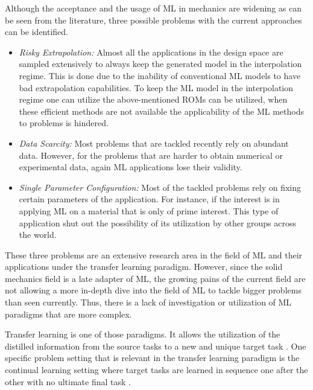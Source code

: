 Although the acceptance and the usage of ML in mechanics are widening as can be seen from the literature, three possible problems with the current approaches can be identified.
\begin{itemize}
  \item \textit{Risky Extrapolation:} Almost all the applications in the design space are sampled extensively to always keep the generated model in the interpolation regime. This is done due to the inability of conventional ML models to have bad extrapolation capabilities. To keep the ML model in the interpolation regime one can utilize the above-mentioned ROMs can be utilized, when these efficient methods are not available the applicability of the ML methods to problems is hindered.
  \item \textit{Data Scarcity:} Most problems that are tackled recently rely on abundant data. However, for the problems that are harder to obtain numerical or experimental data, again ML applications lose their validity.
  \item \textit{Single Parameter Configuration:} Most of the tackled problems rely on fixing certain parameters of the application. For instance, if the interest is in applying ML on a material that is only of prime interest. This type of application shut out the possibility of its utilization by other groups across the world. 
\end{itemize}

  These three problems are an extensive research area in the field of ML and their applications under the transfer learning paradigm. However, since the solid mechanics field is a late adapter of ML, the growing pains of the current field are not allowing a more in-depth dive into the field of ML to tackle bigger problems than seen currently. Thus, there is a lack of investigation or utilization of ML paradigms that are more complex.

Transfer learning is one of those paradigms. It allows the utilization of the distilled information from the source tasks to a new and unique target task \cite{pan2010a}. One specific problem setting that is relevant in the transfer learning paradigm is the continual learning setting where target tasks are learned in sequence one after the other with no ultimate final task \cite{thrun1998}. 

